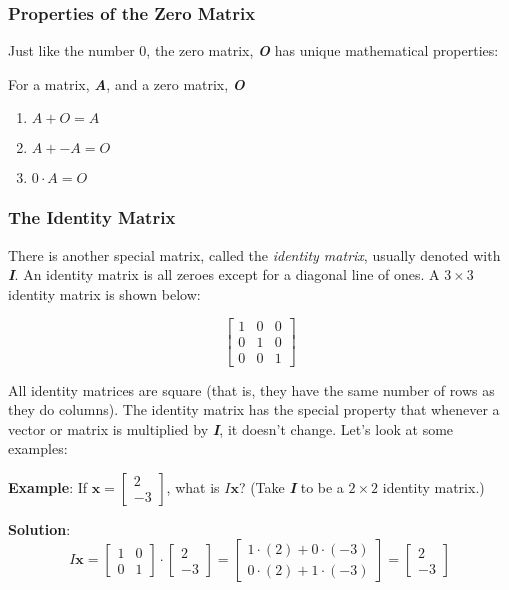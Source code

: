 \subsubsection{Properties of the Zero Matrix}
Just like the number 0, the zero matrix, \textbf{\textit{O}} has unique 
mathematical properties:
\begin{mdframed}[style = important, frametitle = {Properties of the Zero Matrix}]
For a matrix, \textbf{\textit{A}}, and a zero matrix, \textbf{\textit{O}}
\begin{enumerate}
\item $\mathbf{\mathit{A}} + \mathbf{\mathit{O}} = \mathbf{\mathit{A}}$
\item $\mathbf{\mathit{A}} + \mathbf{\mathit{-A}} = \mathbf{\mathit{O}}$
\item $0 \cdot \mathbf{\mathit{A}} = \mathbf{\mathit{O}}$
\end{enumerate}
\end{mdframed}

\subsubsection{The Identity Matrix}
There is another special matrix, called the \textit{identity matrix}, usually denoted with \textbf{\textit{I}}. An identity matrix 
is all zeroes except for a diagonal line of ones. A $3 \times 3$ identity 
matrix is shown below:

$$\begin{bmatrix}
1 & 0 & 0\\
0 & 1 & 0\\
0 & 0 & 1
\end{bmatrix}$$

All identity matrices are square (that is, they have the same number of rows 
as they do columns). The identity matrix has the special property that 
whenever a vector or matrix is multiplied by \textbf{\textit{I}}, it doesn't 
change. Let's look at some examples:

\textbf{Example}: If $\mathbf{x} = \begin{bmatrix}
2\\
-3
\end{bmatrix}$, what is $\mathbf{\mathit{I}}\mathbf{x}$? (Take \textbf{\textit{
I}} to be a $2 \times 2$ identity matrix.)

\textbf{Solution}: $$\mathbf{\mathit{I}} \mathbf{x} = \begin{bmatrix}
1 & 0 \\
0 & 1
\end{bmatrix} \cdot \begin{bmatrix}
2 \\
-3
\end{bmatrix} = \begin{bmatrix}
1 \cdot (2) + 0 \cdot (-3)\\
0 \cdot (2) + 1 \cdot (-3)
\end{bmatrix} = \begin{bmatrix}
2\\
-3
\end{bmatrix}$$

